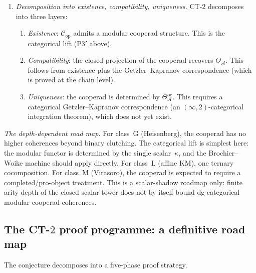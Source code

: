 \documentclass[11pt]{article}
\newcommand{\cA}{\mathcal{A}}
\newcommand{\cC}{\mathcal{C}}
\begin{document}
\begin{remark}
\begin{enumerate}[label=\textup{(P\arabic*$'$)},nosep]
\item \emph{Decomposition into existence, compatibility,
  uniqueness.}
  CT-$2$ decomposes into three layers:
  \begin{enumerate}[label=\textup{(\roman*)},nosep]
  \item \emph{Existence}: $\cC_{\mathrm{op}}$ admits a
    modular cooperad structure.  This is the categorical
    lift (P3$'$ above).
  \item \emph{Compatibility}: the closed projection of
    the cooperad recovers $\Theta_\cA$.  This follows
    from existence plus the Getzler--Kapranov correspondence
    (which is proved at the chain level).
  \item \emph{Uniqueness}: the cooperad is determined by
    $\Theta^{\mathrm{oc}}_\cA$.  This requires a
    categorical Getzler--Kapranov correspondence (an
    $(\infty,2)$-categorical integration theorem), which
    does not yet exist.
  \end{enumerate}
\end{enumerate}

\smallskip\noindent
\emph{The depth-dependent road map.}
For class~G (Heisenberg), the cooperad has no higher
coherences beyond binary clutching.  The categorical lift
is simplest here: the modular functor is determined by the
single scalar~$\kappa$, and the Brochier--Woike machine
should apply directly.  For class~L (affine KM), one
ternary cocomposition.  For class~M (Virasoro), the cooperad
is expected to require a completed/pro-object treatment.
This is a scalar-shadow roadmap only: finite arity depth of the
closed scalar tower does not by itself bound dg-categorical
modular-cooperad coherences.
\end{remark}

\subsection{The CT-$2$ proof programme: a definitive road map}
\label{subsec:ct2-road-map}

The conjecture decomposes into a five-phase proof strategy.
\end{document}
